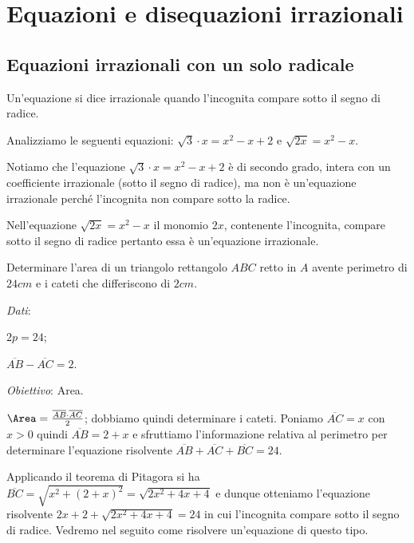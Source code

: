 \chapter{Equazioni e disequazioni irrazionali}
\section{Equazioni irrazionali con un solo radicale}

\begin{definizione}
Un'equazione si dice irrazionale quando l’incognita compare sotto il segno di radice.
\end{definizione}

Analizziamo le seguenti equazioni: $\sqrt 3\cdot x=x^2-x+2$ e $\sqrt{2x}=x^2-x$.

Notiamo che l’equazione $\sqrt 3\cdot x=x^2-x+2$ è di secondo grado, intera con un coefficiente irrazionale (sotto il segno di radice), ma non è un’equazione irrazionale perché l'incognita non compare sotto la radice.

Nell’equazione $\sqrt{2x}=x^2-x$ il monomio $ 2x $, contenente l’incognita, compare sotto il segno di radice pertanto essa è un’equazione irrazionale.
\begin{problema}
Determinare l’area di un triangolo rettangolo $ ABC $ retto in $ A $ avente perimetro di $ 24\unit{cm} $ e i cateti che differiscono di $ 2\unit{cm} $.
\end{problema}

\begin{multicols}{2}
\emph{Dati}:

$2p=24$;

$ \overline{AB}-\overline{AC}=2$.

\emph{Obiettivo}:
Area.

 
\end{multicols}

\begin{soluzione}
${\Area}=\frac{\overline{{AB}}\cdot \overline{{AC}}} 2$; dobbiamo quindi determinare i cateti. Poniamo $\overline{AC}=x$ con $x>0$ quindi $\overline{{AB}}=2+x$ e sfruttiamo l’informazione relativa al perimetro per determinare l’equazione risolvente $\overline{AB}+\overline{AC}+\overline{BC}=24$.

Applicando il teorema di Pitagora si ha $\overline{BC}=\sqrt{x^2+(2+x)^2}=\sqrt{2x^2+4x+4}$ e dunque otteniamo l’equazione risolvente $2x+2+\sqrt{2x^2+4x+4}=24$ in cui l’incognita compare sotto il segno di radice. Vedremo nel seguito come risolvere un'equazione di questo tipo.
\end{soluzione}

